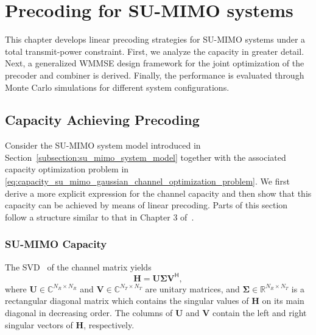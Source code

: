 \chapter{Precoding for SU-MIMO systems}
\label{chapter:su_mimo_precoding}

This chapter develops linear precoding strategies for \ac{SU}-\ac{MIMO} systems under a total transmit-power constraint.
First, we analyze the capacity in greater detail. Next, a generalized \acs{WMMSE} design framework for the joint optimization of the precoder and combiner is derived.
Finally, the performance is evaluated through Monte Carlo simulations for different system configurations.


\section{Capacity Achieving Precoding}
\label{section:capacity_achieving_precoding}

Consider the \ac{SU}-\ac{MIMO} system model introduced in Section~\ref{subsection:su_mimo_system_model} together with the associated capacity optimization problem in \eqref{eq:capacity_su_mimo_gaussian_channel_optimization_problem}.
We first derive a more explicit expression for the channel capacity and then show that this capacity can be achieved by means of linear precoding.
Parts of this section follow a structure similar to that in Chapter 3 of~\cite{cornelis_2025}.

\subsection{SU-MIMO Capacity}
\label{subsection:su_mimo_capacity}

The \ac{SVD}~\cite{svd_lecture_notes} of the channel matrix yields
\begin{equation}
\label{eq:svd_channel_matrix}
    \mathbf{H} = \mathbf{U} \boldsymbol{\Sigma} \mathbf{V}^{\mathsf{H}},
\end{equation}
where $\mathbf{U} \in \mathbb{C}^{N_R \times N_R}$ and $\mathbf{V} \in \mathbb{C}^{N_T \times N_T}$ are unitary matrices, and $\mathbf{\Sigma} \in \mathbb{R}^{N_R \times N_T}$ is a rectangular diagonal matrix which contains the singular values of $\mathbf{H}$ on its main diagonal in decreasing order.
The columns of $\mathbf{U}$ and $\mathbf{V}$ contain the left and right singular vectors of $\mathbf{H}$, respectively.

